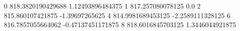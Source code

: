 0 818.3820190429688 1.12493896484375
1 817.257080078125 0.0
2 815.860107421875 -1.39697265625
4 814.9981689453125 -2.2589111328125
6 816.7857055664062 -0.47137451171875
8 818.6016845703125 1.3446044921875
